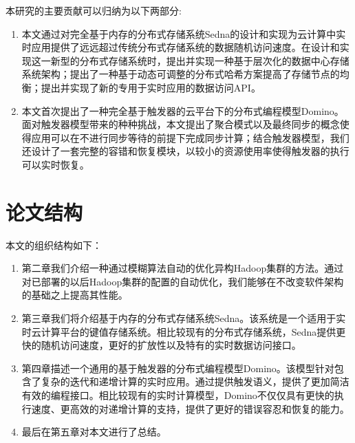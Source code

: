 本研究的主要贡献可以归纳为以下两部分:
\begin{enumerate}
\item 本文通过对完全基于内存的分布式存储系统Sedna的设计和实现为云计算中实时应用提供了远远超过传统分布式存储系统的数据随机访问速度。在设计和实现这一新型的分布式存储系统时，提出并实现一种基于层次化的数据中心存储系统架构；提出了一种基于动态可调整的分布式哈希方案提高了存储节点的均衡；提出并实现了新的专用于实时应用的数据访问API。

\item 本文首次提出了一种完全基于触发器的云平台下的分布式编程模型Domino。面对触发器模型带来的种种挑战，本文提出了聚合模式以及最终同步的概念使得应用可以在不进行同步等待的前提下完成同步计算；结合触发器模型，我们还设计了一套完整的容错和恢复模块，以较小的资源使用率使得触发器的执行可以实时恢复。

\end{enumerate}


\section{论文结构}
本文的组织结构如下：
\begin{enumerate}
  \item 第二章我们介绍一种通过模糊算法自动的优化异构Hadoop集群的方法。通过对已部署的以后Hadoop集群的配置的自动优化，我们能够在不改变软件架构的基础之上提高其性能。
  
  \item 第三章我们将介绍基于内存的分布式存储系统Sedna。该系统是一个适用于实时云计算平台的键值存储系统。相比较现有的分布式存储系统，Sedna提供更快的随机访问速度，更好的扩放性以及特有的实时数据访问接口。
  
  \item 第四章描述一个通用的基于触发器的分布式编程模型Domino。该模型针对包含了复杂的迭代和递增计算的实时应用。通过提供触发语义，提供了更加简洁有效的编程接口。相比较现有的实时计算模型，Domino不仅仅具有更快的执行速度、更高效的对递增计算的支持，提供了更好的错误容忍和恢复的能力。
  
  \item 最后在第五章对本文进行了总结。
\end{enumerate}    
    
    
